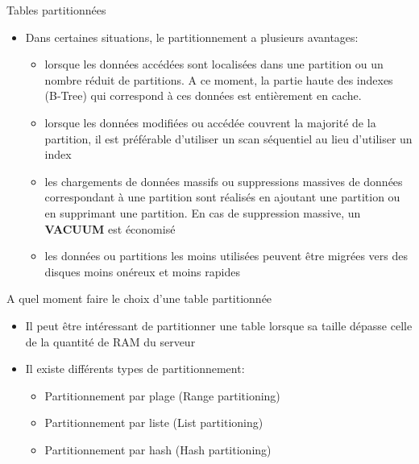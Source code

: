 
\begin{frame}[fragile]{Tables partitionnées}

   \begin{itemize}
      \item Dans certaines situations, le partitionnement a plusieurs avantages:
      \begin{itemize}
         \item lorsque les données accédées sont localisées dans une partition ou un nombre réduit de partitions. A ce moment, la partie haute des indexes (B-Tree) qui correspond à ces données est entièrement en cache.
         \item lorsque les données modifiées ou accédée couvrent la majorité de la partition, il est préférable d'utiliser un scan séquentiel au lieu d'utiliser un index
         \item les chargements de données massifs ou suppressions massives de données correspondant à une partition sont réalisés en ajoutant une partition ou en supprimant une partition. En cas de suppression massive, un \textbf{VACUUM} est économisé
         \item les données ou partitions les moins utilisées peuvent être migrées vers des disques moins onéreux et moins rapides
      \end{itemize}

   \end{itemize}

\end{frame}


\begin{frame}[fragile]{A quel moment faire le choix d'une table partitionnée}

   \begin{itemize}
      \item Il peut être intéressant de partitionner une table lorsque sa taille dépasse celle de la quantité de RAM du serveur
      \item Il existe différents types de partitionnement:
      \begin{itemize}
         \item Partitionnement par plage (Range partitioning)
         \item Partitionnement par liste (List partitioning)
         \item Partitionnement par hash (Hash partitioning)
      \end{itemize}

   \end{itemize}

\end{frame}

